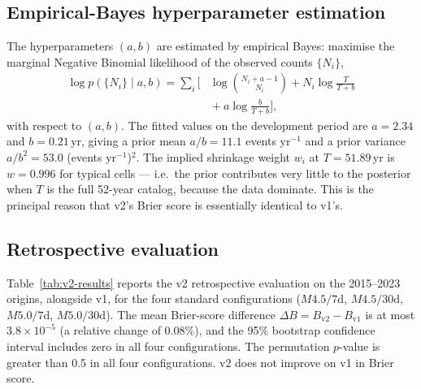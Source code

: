 \documentclass[10pt,a4paper,twocolumn]{article}
\begin{document}
\subsection{Empirical-Bayes hyperparameter estimation}

The hyperparameters $(a,b)$ are estimated by empirical Bayes: maximise the marginal Negative Binomial likelihood of the observed counts $\{N_i\}$,
\begin{equation}\label{eq:eb-mll}
\begin{aligned}
\log p(\{N_i\} \mid a, b) = \sum_i \Bigg[ & \log \binom{N_i + a - 1}{N_i} + N_i \log\frac{T}{T + b} \\
& {} + a \log\frac{b}{T + b} \Bigg],
\end{aligned}
\end{equation}
with respect to $(a,b)$. The fitted values on the development period are $a=2.34$ and $b=0.21$\,yr, giving a prior mean $a/b = 11.1$ events yr$^{-1}$ and a prior variance $a/b^2 = 53.0$ (events yr$^{-1}$)$^2$. The implied shrinkage weight $w_i$ at $T=51.89$\,yr is $w=0.996$ for typical cells --- i.e.\ the prior contributes very little to the posterior when $T$ is the full 52-year catalog, because the data dominate. This is the principal reason that v2's Brier score is essentially identical to v1's.

\subsection{Retrospective evaluation}

Table~\ref{tab:v2-results} reports the v2 retrospective evaluation on the 2015--2023 origins, alongside v1, for the four standard configurations ($M4.5/7$d, $M4.5/30$d, $M5.0/7$d, $M5.0/30$d). The mean Brier-score difference $\Delta B = B_{\text{v2}} - B_{\text{v1}}$ is at most $3.8\times10^{-5}$ (a relative change of 0.08\%), and the 95\% bootstrap confidence interval includes zero in all four configurations. The permutation $p$-value is greater than 0.5 in all four configurations. v2 does not improve on v1 in Brier score.
\end{document}
